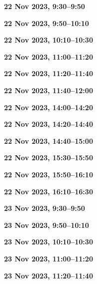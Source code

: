 \documentclass[12pt]{extbook}
\newcommand{\breaktime}[1]{
\bigskip
\begin{center}
\Large\bfseries ***** Break #1 *****
\end{center}
\bigskip}
\renewcommand{\breaktime}[1]{}
\newcommand{\abstract}[2]{{
\bigskip
\begin{center}
\large\bfseries #1
\end{center}}
\par

\clearpage
}
\begin{document}
\abstract{22 Nov 2023, 9:30--9:50}{abstracts/Jacops} %
\abstract{22 Nov 2023, 9:50--10:10}{abstracts/Tomonaga} %
\abstract{22 Nov 2023, 10:10--10:30}{abstracts/Kim} %

\breaktime{30 min}

\abstract{22 Nov 2023, 11:00--11:20}{abstracts/vanLeeuw} %
\abstract{22 Nov 2023, 11:20--11:40}{abstracts/Currle} %
\abstract{22 Nov 2023, 11:40--12:00}{abstracts/Wang} %

\breaktime{ / Lunch}

\abstract{22 Nov 2023, 14:00--14:20}{abstracts/Brennwald} %
\abstract{22 Nov 2023, 14:20--14:40}{abstracts/Blanc} %
\abstract{22 Nov 2023, 14:40--15:00}{abstracts/Marion} %

\breaktime{30 min}

\abstract{22 Nov 2023, 15:30--15:50}{abstracts/Picard} %
\abstract{22 Nov 2023, 15:50--16:10}{abstracts/Hillegonds} %
\abstract{22 Nov 2023, 16:10--16:30}{abstracts/Engelhardt} %



\abstract{23 Nov 2023, 9:30--9:50}{abstracts/Musy} %
\abstract{23 Nov 2023, 9:50--10:10}{abstracts/Zhao} %
\abstract{23 Nov 2023, 10:10--10:30}{abstracts/GroegerTrampe} %

\breaktime{30 min}


\abstract{23 Nov 2023, 11:00--11:20}{abstracts/Iwe} %
\abstract{23 Nov 2023, 11:20--11:40}{abstracts/Slagter} %
\end{document}
